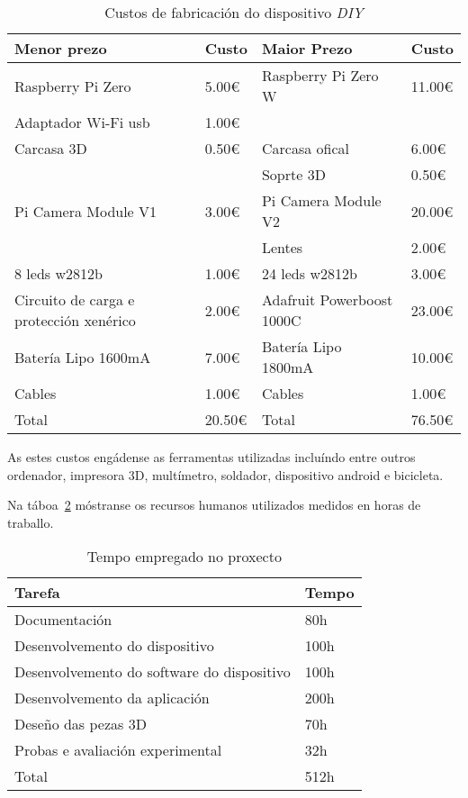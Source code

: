 \begin{table}[tb]
    \label{tab:custos_dispositivo}
    \caption{Custos de fabricación do dispositivo \emph{DIY}}
    \begin{center}
        \begin{tabular}{|l|l||l|l|}
            \hline
             Menor prezo & Custo  & Maior Prezo & Custo \\ \hline
             Raspberry Pi Zero & 5.00€  & Raspberry Pi Zero W& 11.00€ \\ \hline
             Adaptador Wi-Fi usb & 1.00€ &  & \\ \hline
             Carcasa 3D & 0.50€ & Carcasa ofical & 6.00€ \\ \hline
              &  & Soprte 3D & 0.50€ \\ \hline
             Pi Camera Module V1 & 3.00€ & Pi Camera Module V2 & 20.00€ \\ \hline
              &  & Lentes  & 2.00€ \\ \hline
             8 leds w2812b & 1.00€  &  24 leds w2812b & 3.00€\\ \hline
             Circuito de carga e protección xenérico & 2.00€  & Adafruit Powerboost 1000C & 23.00€ \\ \hline
             Batería Lipo 1600mA & 7.00€ & Batería Lipo 1800mA & 10.00€\\ \hline
             Cables & 1.00€ &  Cables & 1.00€ \\ \hline
             Total & 20.50€ &  Total & 76.50€ \\ \hline
        \end{tabular}
    \end{center}
\end{table}

As estes custos engádense as ferramentas utilizadas incluíndo entre outros ordenador, impresora 3D, multímetro, soldador, dispositivo android e bicicleta.

Na táboa~\ref{tab:custos_humanos} móstranse os recursos humanos utilizados medidos en horas de traballo.

\begin{table}[tb]
    \label{tab:custos_humanos}
    \caption{Tempo empregado no proxecto}
    \begin{center}
        \begin{tabular}{|l|l|}
            \hline
             Tarefa & Tempo\\ \hline
             Documentación & 80h \\ \hline
             Desenvolvemento do dispositivo & 100h \\ \hline
             Desenvolvemento do software do dispositivo & 100h \\ \hline
             Desenvolvemento da aplicación & 200h \\ \hline
             Deseño das pezas 3D & 70h \\ \hline
             Probas e avaliación experimental & 32h\\ \hline
             Total & 512h \\ \hline
        \end{tabular}
    \end{center}
\end{table}
